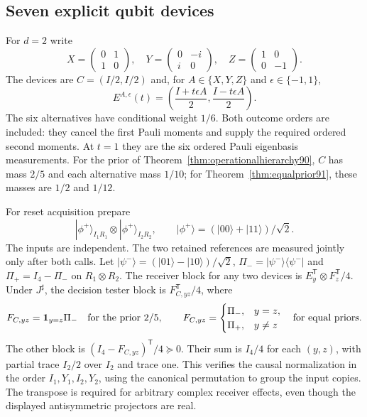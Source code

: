 \subsection{Seven explicit qubit devices}
\label{sec:qubitexplicit91}
For $d=2$ write
\[
 X=\begin{pmatrix}0&1\\1&0\end{pmatrix},\quad
 Y=\begin{pmatrix}0&-i\\i&0\end{pmatrix},\quad
 Z=\begin{pmatrix}1&0\\0&-1\end{pmatrix}.
\]
The devices are $C=(I/2,I/2)$ and, for $A\in\{X,Y,Z\}$ and
$\epsilon\in\{-1,1\}$,
\[
 E^{A,\epsilon}(t)=
 \left(\frac{I+t\epsilon A}{2},\frac{I-t\epsilon A}{2}\right).
\]
The six alternatives have conditional weight $1/6$.
Both outcome orders are included: they cancel the first Pauli moments
and supply the required ordered second moments.  At $t=1$ they are the
six ordered Pauli eigenbasis measurements.  For the prior of
Theorem~\ref{thm:operationalhierarchy90}, $C$ has mass $2/5$ and each
alternative mass $1/10$; for Theorem~\ref{thm:equalprior91}, these masses
are $1/2$ and $1/12$.

For reset acquisition prepare
\[
 |\phi^+\rangle_{I_1R_1}\otimes|\phi^+\rangle_{I_2R_2},\qquad
 |\phi^+\rangle=(|00\rangle+|11\rangle)/\sqrt2.
\]
The inputs are independent.  The two retained references are measured
jointly only after both calls.  Let
$|\psi^-\rangle=(|01\rangle-|10\rangle)/\sqrt2$,
$\Pi_-=|\psi^-\rangle\langle\psi^-|$ and $\Pi_+=I_4-\Pi_-$
on $R_1\otimes R_2$.
The receiver block for any two devices is $E_y^{\mathsf T}\otimes
F_z^{\mathsf T}/4$.  Under $J^\sharp$, the decision tester block is
$F_{C,yz}^{\mathsf T}/4$, where
\[
 F_{C,yz}=\mathbf1_{y=z}\Pi_-
 \quad\hbox{for the prior }2/5,
 \qquad
 F_{C,yz}=\begin{cases}\Pi_-,&y=z,\\\Pi_+,&y\ne z\end{cases}
 \quad\hbox{for equal priors}.
\]
The other block is $(I_4-F_{C,yz})^{\mathsf T}/4\succeq0$.
Their sum is $I_4/4$ for each $(y,z)$, with partial trace
$I_2/2$ over $I_2$ and trace one.  This verifies the causal normalization
in the order $I_1,Y_1,I_2,Y_2$, using the canonical permutation to group
the input copies.  The transpose is required for arbitrary complex
receiver effects, even though the displayed antisymmetric projectors
are real.


